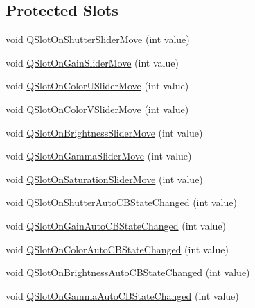 \subsection*{Protected Slots}
\begin{DoxyCompactItemize}
\item 
void \hyperlink{classsvl_qt_widget_vid_cap_src_image_properties_a3fce04f2f2681b1c4100c933b1f2e227}{Q\-Slot\-On\-Shutter\-Slider\-Move} (int value)
\item 
void \hyperlink{classsvl_qt_widget_vid_cap_src_image_properties_a58f6f85158bd32c3cdb62be87a7dca5f}{Q\-Slot\-On\-Gain\-Slider\-Move} (int value)
\item 
void \hyperlink{classsvl_qt_widget_vid_cap_src_image_properties_a2e70426d833ac431d68940b290333029}{Q\-Slot\-On\-Color\-U\-Slider\-Move} (int value)
\item 
void \hyperlink{classsvl_qt_widget_vid_cap_src_image_properties_a8edc8ef88956d71ef7b583523e63bf45}{Q\-Slot\-On\-Color\-V\-Slider\-Move} (int value)
\item 
void \hyperlink{classsvl_qt_widget_vid_cap_src_image_properties_af705c687c06db535edbfde2a8f1c74dd}{Q\-Slot\-On\-Brightness\-Slider\-Move} (int value)
\item 
void \hyperlink{classsvl_qt_widget_vid_cap_src_image_properties_a0a8df417b17aa3f03a43b46463d3e7f3}{Q\-Slot\-On\-Gamma\-Slider\-Move} (int value)
\item 
void \hyperlink{classsvl_qt_widget_vid_cap_src_image_properties_a9dfaf24de7c001739fc9a870458ff8f5}{Q\-Slot\-On\-Saturation\-Slider\-Move} (int value)
\item 
void \hyperlink{classsvl_qt_widget_vid_cap_src_image_properties_a39f2860f42dc260d8618ea0a2b9488d5}{Q\-Slot\-On\-Shutter\-Auto\-C\-B\-State\-Changed} (int value)
\item 
void \hyperlink{classsvl_qt_widget_vid_cap_src_image_properties_af4b31fc1848b2eac39f5fe282edce85b}{Q\-Slot\-On\-Gain\-Auto\-C\-B\-State\-Changed} (int value)
\item 
void \hyperlink{classsvl_qt_widget_vid_cap_src_image_properties_a6e72d5e1bfd9ee47b5eac7a06d4fe5d5}{Q\-Slot\-On\-Color\-Auto\-C\-B\-State\-Changed} (int value)
\item 
void \hyperlink{classsvl_qt_widget_vid_cap_src_image_properties_aeb806e220711861002d77c2549e31f3d}{Q\-Slot\-On\-Brightness\-Auto\-C\-B\-State\-Changed} (int value)
\item 
void \hyperlink{classsvl_qt_widget_vid_cap_src_image_properties_a76230c1ac83642571f9d5afe2e50d905}{Q\-Slot\-On\-Gamma\-Auto\-C\-B\-State\-Changed} (int value)

\end{DoxyCompactItemize}

